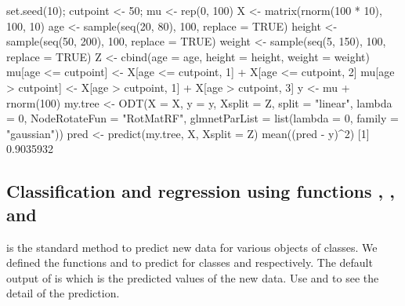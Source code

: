 \begin{example}
set.seed(10); cutpoint <- 50; mu <- rep(0, 100)
X <- matrix(rnorm(100 * 10), 100, 10)
age <- sample(seq(20, 80), 100, replace = TRUE)
height <- sample(seq(50, 200), 100, replace = TRUE)
weight <- sample(seq(5, 150), 100, replace = TRUE)
Z <- cbind(age = age, height = height, weight = weight)
mu[age <= cutpoint] <- X[age <= cutpoint, 1] + X[age <= cutpoint, 2]
mu[age > cutpoint] <- X[age > cutpoint, 1] + X[age > cutpoint, 3]
y <- mu + rnorm(100)
my.tree <- ODT(X = X, y = y, Xsplit = Z, split = "linear", lambda = 0, NodeRotateFun = 
"RotMatRF", glmnetParList = list(lambda = 0, family = "gaussian"))
pred <- predict(my.tree, X, Xsplit = Z)
mean((pred - y)^2)
[1] 0.9035932
\end{example}

\subsection[Classification and regression using ODT, ODRF, and ODBT]{Classification and regression using functions , , and }

 is the standard  method to predict new data for various objects of classes. We defined the functions  and  to predict  for classes  and  respectively. The default output of  is  which is the predicted values of the new data. Use  and  to see the detail of the prediction. 

